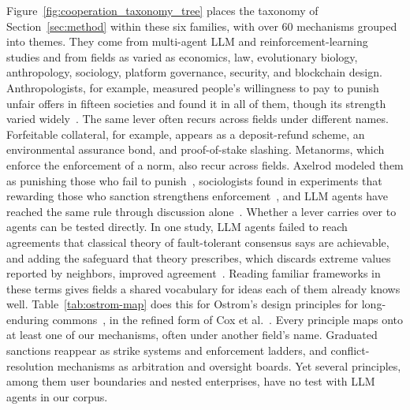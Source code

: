 \documentclass[runningheads]{llncs}
\begin{document}
Figure~\mbox{\ref{fig:cooperation_taxonomy_tree}} places the taxonomy of Section~\mbox{\ref{sec:method}} within these six families, with over 60 mechanisms grouped into themes. They come from multi-agent LLM and reinforcement-learning studies and from fields as varied as economics, law, evolutionary biology, anthropology, sociology, platform governance, security, and blockchain design. Anthropologists, for example, measured people's willingness to pay to punish unfair offers in fifteen societies and found it in all of them, though its strength varied widely~\mbox{\citep{henrich2006costly}}. The same lever often recurs across fields under different names. Forfeitable collateral, for example, appears as a deposit-refund scheme, an environmental assurance bond, and proof-of-stake slashing. Metanorms, which enforce the enforcement of a norm, also recur across fields. Axelrod modeled them as punishing those who fail to punish~\mbox{\citep{axelrod1986evolutionary}}, sociologists found in experiments that rewarding those who sanction strengthens enforcement~\mbox{\citep{horne2002sanctioning}}, and LLM agents have reached the same rule through discussion alone~\mbox{\citep{horiguchi2024evolution}}. Whether a lever carries over to agents can be tested directly. In one study, LLM agents failed to reach agreements that classical theory of fault-tolerant consensus says are achievable, and adding the safeguard that theory prescribes, which discards extreme values reported by neighbors, improved agreement~\mbox{\citep{anand2026consensus}}. Reading familiar frameworks in these terms gives fields a shared vocabulary for ideas each of them already knows well. Table~\mbox{\ref{tab:ostrom-map}} does this for Ostrom's design principles for long-enduring commons~\mbox{\citep{ostromGoverningCommonsEvolution1990}}, in the refined form of Cox et al.~\mbox{\citep{cox2010designprinciples}}. Every principle maps onto at least one of our mechanisms, often under another field's name. Graduated sanctions reappear as strike systems and enforcement ladders, and conflict-resolution mechanisms as arbitration and oversight boards. Yet several principles, among them user boundaries and nested enterprises, have no test with LLM agents in our corpus.
\end{document}
